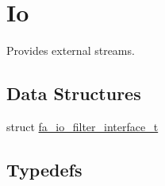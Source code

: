 \hypertarget{group___fa_io}{\section{Io}
\label{group___fa_io}
}


Provides external streams.  


\subsection*{Data Structures}
\begin{DoxyCompactItemize}
\item 
struct \hyperlink{structfa__io__filter__interface__t}{fa\-\_\-io\-\_\-filter\-\_\-interface\-\_\-t}
\end{DoxyCompactItemize}
\subsection*{Typedefs}

